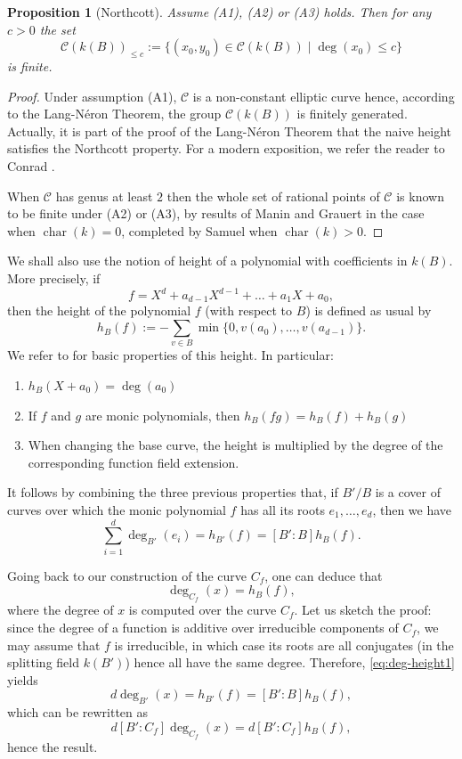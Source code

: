 \documentclass[11pt]{article}
\theoremstyle{plain}
\newtheorem{proposition}[theorem]{Proposition}
\theoremstyle{definition}
\DeclareMathOperator{\car}{char}
\begin{document}
\begin{proposition}[Northcott]
Assume (A1), (A2) or (A3) holds. Then for any $c>0$ the set
$$
\mathcal{C}(k(B))_{\leq c} := \{(x_0,y_0)\in \mathcal{C}(k(B)) \mid \deg(x_0)\leq c\}
$$
is finite.
\end{proposition}

\begin{proof}
Under assumption (A1), $\mathcal{C}$ is a non-constant elliptic curve hence, according to the Lang-N\'eron Theorem, the group $\mathcal{C}(k(B))$ is finitely generated. Actually, it is part of the proof of the Lang-N\'eron Theorem that the naive height satisfies the Northcott property. For a modern exposition, we refer the reader to Conrad \cite[Section~7]{conrad06}.

When $\mathcal{C}$ has genus at least $2$ then the whole set of rational points of $\mathcal{C}$ is known to be finite under (A2) or (A3), by results of Manin \cite{manin63} and Grauert \cite{grauert65} in the case when $\car(k)=0$, completed by Samuel \cite{samuel66} when $\car(k)>0$. 
\end{proof}


We shall also use the notion of height of a polynomial with coefficients in $k(B)$. More precisely, if
$$
f = X^d + a_{d-1}X^{d-1} + \dots + a_1X + a_0,
$$
then the height of the polynomial $f$ (with respect to $B$) is defined as usual by
$$
h_B(f) := -\sum_{v\in B} \min\{0,v(a_0),\dots,v(a_{d-1})\}.
$$
We refer to \cite[Chap.~I, \S{}2]{mason84} for basic properties of this height. In particular:
\begin{enumerate}
  \item $h_B(X+a_0)=\deg(a_0)$
  \item If $f$ and $g$ are monic polynomials, then $h_B(fg)=h_B(f)+h_B(g)$
  \item When changing the base curve, the height is multiplied by the degree of the corresponding function field extension.
\end{enumerate}

It follows by combining the three previous properties that, if $B'/B$ is a cover of curves over which the monic polynomial $f$ has all its roots $e_1,\dots, e_d$, then we have
\begin{equation}
\label{eq:deg-height1}
\sum_{i=1}^d \deg_{B'}(e_i) = h_{B'}(f) = [B':B]h_B(f).
\end{equation}

Going back to our construction of the curve $C_f$, one can deduce that
\begin{equation}
\label{eq:deg-height2}
\deg_{C_f}(x) = h_B(f),
\end{equation}
where the degree of $x$ is computed over the curve $C_f$. Let us sketch the proof: since the degree of a function is additive over irreducible components of $C_f$, we may assume that $f$ is irreducible, in which case its roots are all conjugates (in the splitting field $k(B')$) hence all have the same degree. Therefore, \eqref{eq:deg-height1} yields
$$
d\deg_{B'}(x) = h_{B'}(f) = [B':B]h_B(f),
$$
which can be rewritten as
$$
d[B':C_f]\deg_{C_f}(x) = d[B':C_f]h_B(f),
$$
hence the result.
\end{document}
